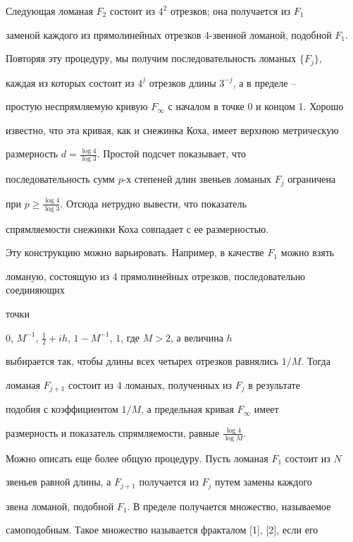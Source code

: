 Следующая ломаная $F_2$ состоит из $4^2$ отрезков; она получается из $F_1$


заменой каждого из прямолинейных отрезков 4-звенной ломаной, подобной $F_1$.


Повторяя эту процедуру, мы получим последовательность ломаных $\{F_j\}$,


каждая из которых состоит из $4^j$ отрезков длины $3^{-j}$, а в пределе --


простую неспрямляемую кривую $F_\infty$ с началом в точке 0 и концом 1. Хорошо


известно, что эта кривая, как и снежинка Коха, имеет верхнюю метрическую


размерность $d = \frac{\log 4}{\log 3}$. Простой подсчет показывает, что


последовательность сумм $p$-х степеней длин звеньев ломаных $F_j$ ограничена


при $p\ge \frac{\log 4}{\log 3}$. Отсюда нетрудно вывести, что показатель


спрямляемости снежинки Коха совпадает с ее размерностью.





Эту конструкцию можно варьировать. Например, в качестве $F_1$ можно взять


ломаную, состоящую из 4 прямолинейных отрезков, последовательно соединяющих


точки


$0$, $M^{-1}$, $\frac{1}{2}+ih$, $1-M^{-1}$, $1$, где $M>2$, а величина $h$


выбирается так, чтобы длины всех четырех отрезков равнялись $1/M$. Тогда


ломаная $F_{j+1}$ состоит из 4 ломаных, полученных из $F_j$ в результате


подобия с коэффициентом $1/M$, а предельная кривая $F_\infty$ имеет


размерность и показатель спрямляемости, равные $\frac{\log 4}{\log M}$.





Можно описать еще более общую процедуру. Пусть ломаная $F_1$ состоит из $N$


звеньев равной длины, а $F_{j+1}$ получается из $F_{j}$ путем замены каждого


звена ломаной, подобной $F_1$. В пределе получается множество, называемое


самоподобным. Такое множество называется фракталом [1], [2], если его


